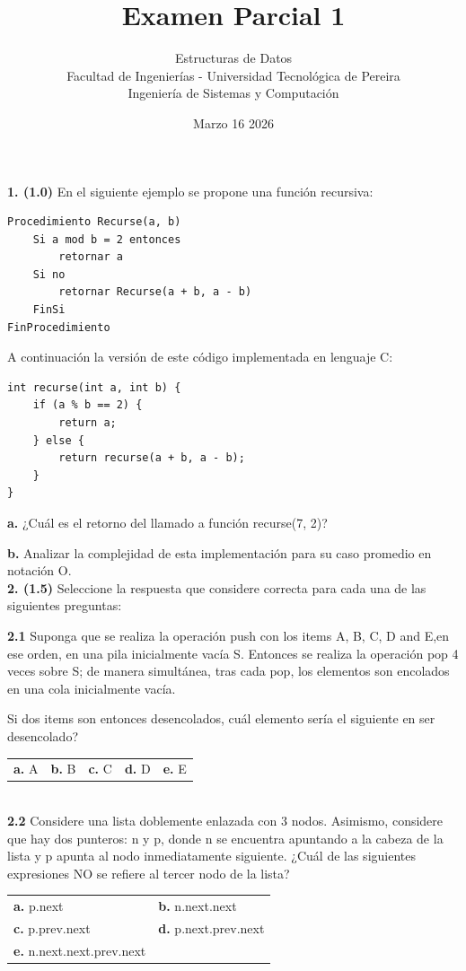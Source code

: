 \documentclass[twocolumn]{article}
\title{Examen Parcial 1}
\author{Estructuras de Datos \\ Facultad de Ingenierías - Universidad Tecnológica de Pereira \\ Ingeniería de Sistemas y Computación}
\date{Marzo 16 2026}
\begin{document}
\maketitle
\thispagestyle{empty}

\textbf{1. (1.0)} En el siguiente ejemplo se propone una función recursiva:

\begin{verbatim}
Procedimiento Recurse(a, b)
    Si a mod b = 2 entonces
        retornar a
    Si no
        retornar Recurse(a + b, a - b)
    FinSi
FinProcedimiento
\end{verbatim}

A continuación la versión de este código implementada en lenguaje C:

\begin{verbatim}
int recurse(int a, int b) {
    if (a % b == 2) {
        return a;
    } else {
        return recurse(a + b, a - b);
    }
}
\end{verbatim}


\textbf{a.} ¿Cuál es el retorno del llamado a función recurse(7, 2)?

\textbf{b.} Analizar la complejidad de esta implementación para su caso promedio en notación O. \\

\textbf{2. (1.5)} Seleccione la respuesta que considere correcta para cada una de las siguientes preguntas:

\textbf{2.1} Suponga que se realiza la operación push con los items A, B, C, D and E,en ese orden, en una pila inicialmente vacía S. Entonces se realiza la operación pop 4 veces sobre S; de manera simultánea, tras cada pop, los elementos son encolados en una cola inicialmente vacía.

Si dos items son entonces desencolados, cuál elemento sería el siguiente en ser desencolado?
\begin{tabular}{ccccc}
\textbf{a.} A & \textbf{b.} B & \textbf{c.} C & \textbf{d.} D & \textbf{e.} E
\end{tabular}\\

\textbf{2.2} Considere una lista doblemente enlazada con 3 nodos. Asimismo, considere que hay dos punteros: n y p, donde n se encuentra apuntando a la cabeza de la lista y p apunta al nodo inmediatamente siguiente. ¿Cuál de las siguientes expresiones NO se refiere al tercer nodo de la lista?
\begin{tabular}{ll}
\textbf{a.} p.next & \textbf{b.} n.next.next \\
\textbf{c.} p.prev.next & \textbf{d.} p.next.prev.next \\ 
\textbf{e.} n.next.next.prev.next \\ 
\end{tabular}\\
\end{document}
